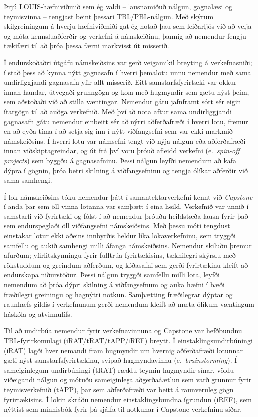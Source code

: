 \documentclass{article}
\begin{document}
Þrjú LOUIS-hæfniviðmið sem ég valdi -- lausnamiðuð nálgun, gagnalæsi og teymisvinna -- tengjast beint þessari TBL/PBL-nálgun. Með skýrum skilgreiningum á hverju hæfniviðmiði gat ég notað þau sem leiðarljós við að velja og móta kennsluaðferðir og verkefni á námskeiðinu, þannig að nemendur fengju tækifæri til að þróa þessa færni markvisst út misserið.

Í endurskoðaðri útgáfu námskeiðsins var gerð veigamikil breyting á verkefnasniði; í stað þess að kynna nýtt gagnasafn í hverri þemalotu unnu nemendur með sama undirliggjandi gagnasafn yfir allt misserið. Eitt samstarfsfyrirtæki var okkur innan handar, útvegaði grunngögn og kom með hugmyndir sem gætu nýst þeim, sem aðstoðaði við að stilla væntingar. Nemendur gátu jafnframt sótt sér eigin ítargögn til að auðga verkefnið. Með því að nota aftur sama undirliggjandi gagnasafn gátu nemendur einbeitt sér að nýrri aðferðafræði í hverri lotu, fremur en að eyða tíma í að setja sig inn í nýtt viðfangsefni sem var ekki markmið námskeiðsins. Í hverri lotu var námsefni tengt við nýja nálgun eða aðferðafræði innan viðskiptagreindar, og út frá því voru þróuð afleidd verkefni (e.~\emph{spin-off projects}) sem byggðu á gagnasafninu. Þessi nálgun leyfði nemendum að kafa dýpra í gögnin, þróa betri skilning á viðfangsefninu og tengja ólíkar aðferðir við sama samhengi.

Í lok námskeiðsins tóku nemendur þátt í samantektarverkefni kennt við \textit{Capstone} í anda \cite{capstone} þar sem öll vinna lotanna var samþætt í eina heild. Verkefnið var unnið í samstarfi við fyrirtæki og fólst í að nemendur þróuðu heildstæða lausn fyrir það sem endurspeglaði öll viðfangsefni námskeiðsins. Með þessu móti tengdust einstakar lotur ekki aðeins innbyrðis heldur líka lokaverkefninu, sem tryggði samfellu og aukið samhengi milli áfanga námskeiðsins. Nemendur skiluðu þremur afurðum; yfirlitskynningu fyrir fulltrúa fyrirtækisins, tæknilegri skýrslu með rökstuddum og greindum aðferðum, og kóðasafni sem gerði fyrirtækinu kleift að endurskapa niðurstöður. Þessi nálgun tryggði samfellu milli lota, leyfði nemendum að þróa dýpri skilning á viðfangsefnum og auka hæfni í bæði fræðilegri greiningu og hagnýtri notkun. Samþætting fræðilegrar dýptar og raunhæfs gildis í verkefnunum gerði nemendum kleift að mæta ólíkum væntingum háskóla og atvinnulífs.

Til að undirbúa nemendur fyrir verkefnavinnuna og Capstone var hefðbundnu TBL-fyrirkomulagi (iRAT/tRAT/tAPP/iREF) breytt. Í einstaklingsundirbúningi (iRAT) lagði hver nemandi fram hugmyndir um hvernig aðferðafræði lotunnar gæti nýst samstarfsfyrirtækinu, svipað hugmyndavinnu (e.~\emph{brainstorming}). Í sameiginlegum undirbúningi (tRAT) ræddu teymin hugmyndir sínar, völdu viðeigandi nálgun og mótuðu sameiginlega aðgerðaáætlun sem varð grunnur fyrir teymisverkefnið (tAPP), þar sem aðferðafræði var beitt á raunveruleg gögn fyrirtækisins. Í lokin skráðu nemendur einstaklingsbundna ígrundun (iREF), sem nýttist sem minnisbók fyrir þá sjálfa til notkunar í Capstone-verkefninu síðar.
\end{document}
